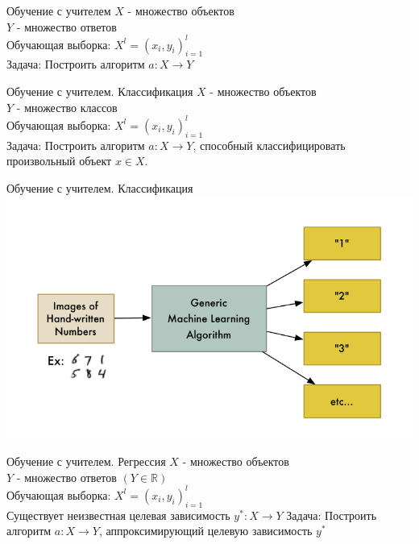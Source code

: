 \documentclass[10pt]{beamer}
\begin{document}
{
\begin{frame}{Обучение с учителем}
  	$X$ - множество объектов \\
	$Y$ - множество ответов \\
	Обучающая выборка: ${X^l = (x_i, y_i)_{i=1}^l}$ \\  
	\bigbreak
	\bigbreak
	\alert{Задача}: Построить алгоритм ${a \colon X \rightarrow Y}$
\end{frame}
}

{
\begin{frame}{Обучение с учителем. Классификация }
	$X$ - множество объектов \\
	$Y$ - множество классов \\
	Обучающая выборка: ${X^l = (x_i, y_i)_{i=1}^l}$ \\ 
	\bigbreak
	\bigbreak
	\alert{Задача}: Построить алгоритм ${a \colon X \rightarrow Y}$, способный классифицировать произвольный объект ${x \in X}$.
\end{frame}
}

{
\begin{frame}{Обучение с учителем. Классификация}
  \centering
  \includegraphics[width=0.9 \linewidth, height=0.9 \textheight, keepaspectratio]{images/mnist}\\
\end{frame}
}

{
\begin{frame}{Обучение с учителем. Регрессия}
  $X$ - множество объектов \\
	$Y$ - множество ответов ${(Y \in \mathbb{R})}$\\
	Обучающая выборка: ${X^l = (x_i, y_i)_{i=1}^l}$ \\ 
	Существует неизвестная целевая зависимость $y^*: X \rightarrow Y$
	\bigbreak
	\bigbreak
	\alert{Задача}: Построить алгоритм ${a \colon X \rightarrow Y}$, аппроксимирующий целевую зависимость $y^*$
\end{frame}
}
\end{document}
